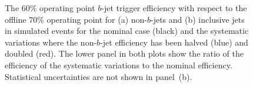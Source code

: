 \begin{figure}[!ht]
  \begin{center}
    \captionsetup[subfigure]{aboveskip=0pt,justification=centering}
    \hspace{-0.5cm}
  \end{center}
\vspace{-1em}
  \caption[The $b$-jet trigger efficiency for  non-$b$-jets and inclusive jets for systematic variations of the non-$b$-jet efficiency.]
          {The 60\% operating point $b$-jet trigger efficiency with respect to the offline 70\% operating point
            for (a) non-$b$-jets and (b) inclusive jets in simulated events
            for the  nominal case (black) and the systematic variations where the non-$b$-jet efficiency has been halved (blue) and doubled (red).
            The lower panel in both plots show the ratio of the efficiency of the systematic variations to the nominal efficiency.
            Statistical uncertainties are not shown in panel~(b).
  }
  \label{fig:Eff_LTrigEff}
\end{figure}


